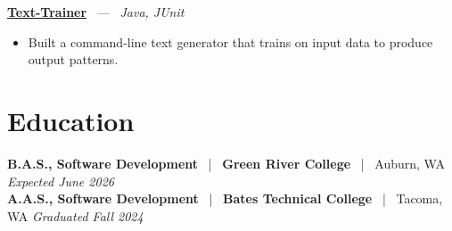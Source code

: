 \documentclass[10pt, letterpaper]{article}
\newcommand{\jobhead}[4]{%
  \vspace{5pt}%
  {\bfseries\color{dark}#1}%
  ~{\color{light}|}~%
  {\bfseries\color{navy}#2}%
  ~{\color{light}|}~%
  {\color{light}#3}%
  \hfill{\color{light}\small\textit{#4}}\\[-2pt]%
}
\newcommand{\projhead}[3]{%
  \vspace{5pt}%
  {\bfseries\color{dark}\href{#2}{#1}}%
  ~{\color{light}---}~%
  {\color{light}\small\textit{#3}}\\[-2pt]%
}
\begin{document}
\projhead{Text-Trainer}{https://github.com/timmyd4/ramblebot}{Java, JUnit}
\begin{itemize}
  \item Built a command-line text generator that trains on input data to produce output patterns.
\end{itemize}

\section{Education}

\jobhead{B.A.S., Software Development}{Green River College}{Auburn, WA}{Expected June 2026}
\jobhead{A.A.S., Software Development}{Bates Technical College}{Tacoma, WA}{Graduated Fall 2024}
\end{document}
